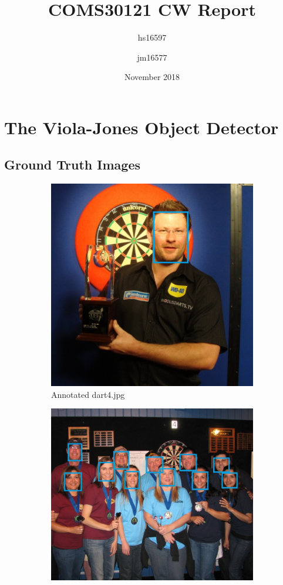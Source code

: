 \documentclass{article}
\title{COMS30121 CW Report}
\author{hs16597 \and jm16577}
\date{November 2018}
\begin{document}
  \maketitle
  \section{The Viola-Jones Object Detector}
    \subsection{Ground Truth Images}
      \begin{figure}[h!]
        \centering
        \begin{subfigure}[b]{0.22\linewidth}
          \includegraphics[width=\linewidth]{dart4_faces.png}
          \caption{Annotated dart4.jpg}
        \end{subfigure}
        \begin{subfigure}[b]{0.25\linewidth}
          \includegraphics[width=\linewidth]{dart5_faces.png}

\end{subfigure}
\end{figure}
\end{document}
